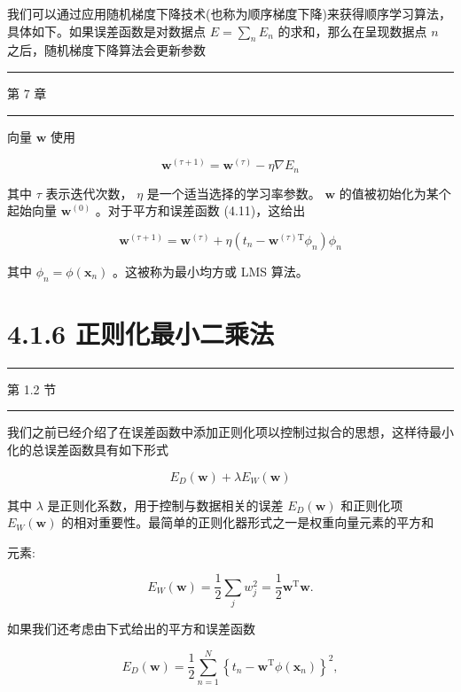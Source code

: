 \documentclass[10pt]{report}
\newcommand{\HRule}{\begin{center}\rule{0.9\linewidth}{0.2mm}\end{center}}
\begin{document}
我们可以通过应用随机梯度下降技术(也称为顺序梯度下降)来获得顺序学习算法，具体如下。如果误差函数是对数据点 \(E = \mathop{\sum }\limits_{n}{E}_{n}\) 的求和，那么在呈现数据点 \(n\) 之后，随机梯度下降算法会更新参数

\HRule

第 7 章

\HRule

向量 \(\mathbf{w}\) 使用

\[
{\mathbf{w}}^{\left( \tau  + 1\right) } = {\mathbf{w}}^{\left( \tau \right) } - \eta \nabla {E}_{n} \tag{4.21}
\]

其中 \(\tau\) 表示迭代次数， \(\eta\) 是一个适当选择的学习率参数。 \(\mathbf{w}\) 的值被初始化为某个起始向量 \({\mathbf{w}}^{\left( 0\right) }\) 。对于平方和误差函数 (4.11)，这给出

\[
{\mathbf{w}}^{\left( \tau  + 1\right) } = {\mathbf{w}}^{\left( \tau \right) } + \eta \left( {{t}_{n} - {\mathbf{w}}^{\left( \tau \right) \mathrm{T}}{\phi }_{n}}\right) {\phi }_{n} \tag{4.22}
\]

其中 \({\phi }_{n} = \phi \left( {\mathbf{x}}_{n}\right)\) 。这被称为最小均方或 LMS 算法。

\section*{4.1.6 正则化最小二乘法}

\HRule

第 1.2 节

\HRule

我们之前已经介绍了在误差函数中添加正则化项以控制过拟合的思想，这样待最小化的总误差函数具有如下形式

\[
{E}_{D}\left( \mathbf{w}\right)  + \lambda {E}_{W}\left( \mathbf{w}\right)  \tag{4.23}
\]

其中 \(\lambda\) 是正则化系数，用于控制与数据相关的误差 \({E}_{D}\left( \mathbf{w}\right)\) 和正则化项 \({E}_{W}\left( \mathbf{w}\right)\) 的相对重要性。最简单的正则化器形式之一是权重向量元素的平方和

元素:

\[
{E}_{W}\left( \mathbf{w}\right)  = \frac{1}{2}\mathop{\sum }\limits_{j}{w}_{j}^{2} = \frac{1}{2}{\mathbf{w}}^{\mathrm{T}}\mathbf{w}. \tag{4.24}
\]

如果我们还考虑由下式给出的平方和误差函数

\[
{E}_{D}\left( \mathbf{w}\right)  = \frac{1}{2}\mathop{\sum }\limits_{{n = 1}}^{N}{\left\{  {t}_{n} - {\mathbf{w}}^{\mathrm{T}}\phi \left( {\mathbf{x}}_{n}\right) \right\}  }^{2}, \tag{4.25}
\]
\end{document}
